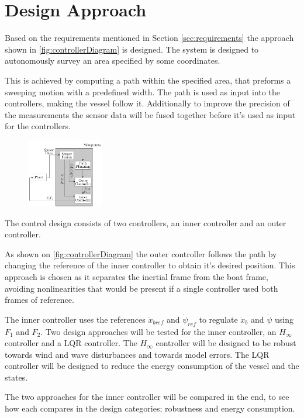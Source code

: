 \chapter{Design Approach} \label{chap:designaproach}
Based on the requirements mentioned in Section \ref{sec:requirements} the approach shown in \autoref{fig:controllerDiagram} is designed. 
The system is designed to autonomously survey an area specified by some coordinates.

This is achieved by computing a path within the specified area, that preforms a sweeping motion with a predefined width.
The path is used as input into the controllers, making the vessel follow it. 
Additionally to improve the precision of the measurements the sensor data will be fused together before it's used as input for the controllers. 
\begin{figure}[H]
    \includegraphics[width=0.3\textwidth]{figures/controllerDiagram2}
    \caption{}
    \label{fig:controllerDiagram}
\end{figure}

The control design consists of two controllers, an inner controller and an outer controller. 

As shown on \autoref{fig:controllerDiagram} the outer controller follows the path by changing the reference of the inner controller to obtain it's desired position. 
This approach is chosen as it separates the inertial frame from the boat frame, avoiding nonlinearities that would be present if a single controller used both frames of reference. 

The inner controller uses the references $\dot{x}_{bref}$ and $\dot{\psi}_{ref}$ to regulate $\dot{x}_{b}$ and $\dot{\psi}$ using $F_{1}$ and $F_{2}$. 
Two design approaches will be tested for the inner controller, an $H_{\infty}$ controller and a LQR controller.
The $H_{\infty}$ controller will be designed to be robust towards wind and wave disturbances and towards model errors. 
The LQR controller will be designed to reduce the energy consumption of the vessel and the states. 

The two approaches for the inner controller will be compared in the end, to see how each compares in the design categories; robustness and energy consumption. 

